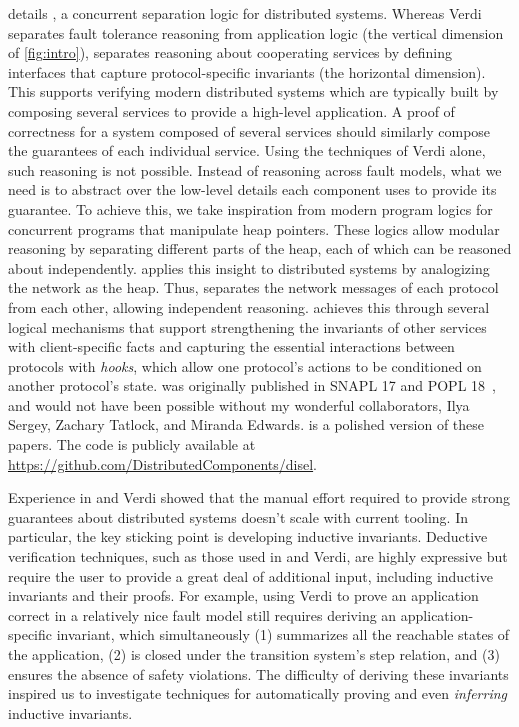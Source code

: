 

 details \disel,
  a concurrent separation logic for distributed systems.
Whereas
  Verdi separates fault tolerance reasoning from application logic
  (the vertical dimension of \cref{fig:intro}),
  \disel separates reasoning about cooperating services
  by defining interfaces that capture protocol-specific invariants
  (the horizontal dimension).
This supports verifying modern distributed systems
  which are typically built by composing several services
  to provide a high-level application.
A proof of correctness for a system composed of several services
  should similarly compose the guarantees of each individual service.
Using the techniques of Verdi alone,
  such reasoning is not possible.
Instead of reasoning across fault models,
  what we need is
  to abstract over the low-level details
  each component uses to provide its guarantee.
To achieve this, we take inspiration
  from modern program logics for concurrent programs
  that manipulate heap pointers.
These logics allow modular reasoning
  by separating different parts of the heap,
  each of which can be reasoned about independently.
\disel applies this insight to distributed systems
  by analogizing the network as the heap.
Thus, \disel separates the network messages
  of each protocol from each other,
  allowing independent reasoning.
\disel achieves this through several logical mechanisms
  that support strengthening the invariants
  of other services with client-specific facts and
  capturing the essential interactions
  between protocols with \emph{hooks},
  which allow one protocol's actions
  to be conditioned on another protocol's state.
\disel was originally published in SNAPL 17 and POPL 18~\cite{Wilcox-al:SNAPL17, disel-popl18},
  and would not have been possible without my wonderful collaborators,
  Ilya Sergey, Zachary Tatlock, and Miranda Edwards.
 is a polished version of these papers.
The \disel code is publicly available at \url{https://github.com/DistributedComponents/disel}.

Experience in \disel and Verdi showed
  that the manual effort required
  to provide strong guarantees about distributed systems
  doesn't scale with current tooling.
In particular, the key sticking point is developing inductive invariants.
Deductive verification techniques,
  such as those used in \disel and Verdi,
  are highly expressive
  but require the user to provide a great deal of additional input,
  including inductive invariants and their proofs.
For example, using Verdi to prove an application correct
  in a relatively nice fault model
  still requires deriving an application-specific invariant,
  which simultaneously
    (1) summarizes all the reachable states of the application,
    (2) is closed under the transition system's step relation, and
    (3) ensures the absence of safety violations.
The difficulty of deriving these invariants
  inspired us to investigate techniques
  for automatically proving and even \emph{inferring} inductive invariants.

